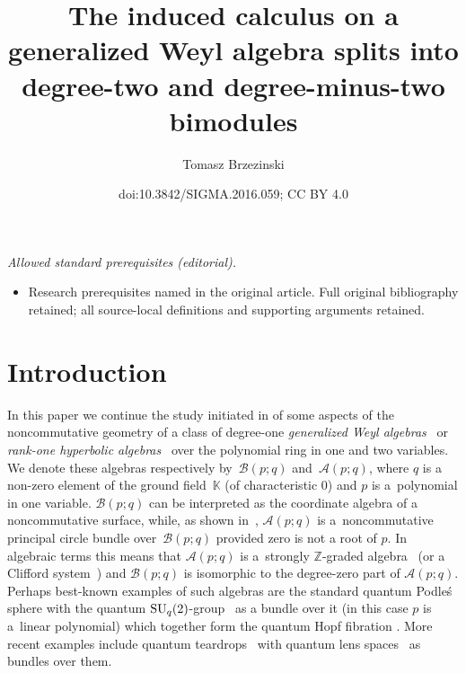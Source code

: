 \documentclass[10pt,a4paper]{amsart}
\title{The induced calculus on a generalized Weyl algebra splits into degree-two and degree-minus-two bimodules}
\author{Tomasz Brzezinski}
\date{doi:10.3842/SIGMA.2016.059; CC BY 4.0}
\numberwithin{equation}{section}
\def\Weyl#1#2{{\mathcal{B}}(#1;#2)}
\def\AWeyl#1#2{{\mathcal{A}}(#1;#2)}
\begin{document}
\maketitle
\noindent\textit{Allowed standard prerequisites (editorial).}\begin{itemize}
\item Research prerequisites named in the original article. Full original bibliography retained; all source-local definitions and supporting arguments retained.
\end{itemize}\medskip
\section{Introduction}\label{sec.intro}
In this paper we continue the study initiated in \cite{Brz:gen} of some aspects of the noncommutative geo\-met\-ry of a class of degree-one {\em generalized Weyl algebras}~\cite{Bav:gweyl} or {\em rank-one hyperbolic algebras}~\cite{LunRos:Kas} over the polynomial ring in one and two variables. We denote these algebras respectively by~$\Weyl p q$ and~$\AWeyl p q$, where $q$ is a non-zero element of the ground f\/ield~${\mathbb K}$ (of characteristic 0) and $p$ is a~polynomial in one variable. $\Weyl p q$ can be interpreted as the coordinate algebra of a noncommutative surface, while, as shown in~\cite{Brz:gen}, $\AWeyl p q$ is a~noncommutative principal circle bundle over~$\Weyl p q$ provided zero is not a root of $p$. In algebraic terms this means that $\AWeyl p q$ is a~strongly ${\mathbb Z}$-graded algebra~\cite{Dad:gro} (or a Clif\/ford system~\cite{Dad:com}) and $\Weyl p q$ is isomorphic to the degree-zero part of $\AWeyl p q$. Perhaps best-known examples of such algebras are the standard quantum Podle\'s sphere \cite{Pod:sph} with the quantum ${\rm SU}_q(2)$-group~\cite{Wor:com} as a bundle over it (in this case $p$ is a~linear polynomial) which together form the quantum Hopf f\/ibration \cite{BrzMaj:gau}. More recent examples include quantum teardrops~\cite{BrzFai:tea} with quantum lens spaces~\cite{HonSzy:len} as bundles over them.
\end{document}
